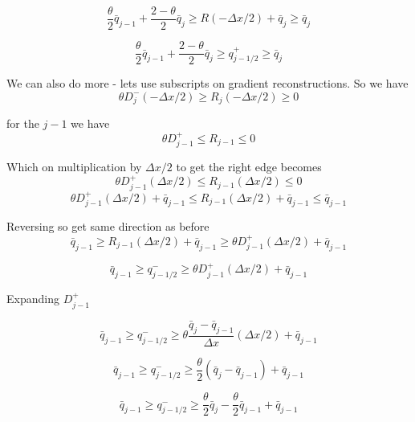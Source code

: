 \documentclass[10pt]{article}
\begin{document}
\[\frac{\theta}{2} \bar{q}_{j-1} + \frac{2 - \theta}{2}\bar{q}_{j}  \ge R \left(-\Delta x/2\right) + \bar{q}_{j}  \ge \bar{q}_{j} \]

\[\frac{\theta}{2} \bar{q}_{j-1} + \frac{2 - \theta}{2}\bar{q}_{j}  \ge q^+_{j-1/2} \ge \bar{q}_{j} \]

%

We can also do more - lets use subscripts on gradient reconstructions. So we have
\[\theta D^-_j \left(-\Delta x/2\right) \ge R_j \left(-\Delta x/2\right)  \ge 0 \]

for the $j-1$ we have
\[\theta D^+_{j-1} \le R_{j-1} \le 0\]

Which on multiplication by $\Delta x/2$ to get the right edge becomes
\[\theta D^+_{j-1} \left(\Delta x / 2\right)  \le R_{j-1} \left(\Delta x / 2\right) \le 0\]
\[\theta D^+_{j-1} \left(\Delta x / 2\right) + \bar{q}_{j-1}  \le R_{j-1} \left(\Delta x / 2\right) + \bar{q}_{j-1}  \le  \bar{q}_{j-1} \]

Reversing  so get same direction as before
\[\bar{q}_{j-1} \ge R_{j-1} \left(\Delta x / 2\right) + \bar{q}_{j-1} \ge \theta D^+_{j-1} \left(\Delta x / 2\right) + \bar{q}_{j-1}    \]

\[\bar{q}_{j-1} \ge q^-_{j-1/2} \ge \theta D^+_{j-1} \left(\Delta x / 2\right) + \bar{q}_{j-1}    \]

Expanding $D^+_{j-1}$

\[\bar{q}_{j-1} \ge q^-_{j-1/2} \ge \theta \dfrac{\bar{q}_{j} - \bar{q}_{j-1}}{\Delta x} \left(\Delta x / 2\right) + \bar{q}_{j-1}    \]

\[\bar{q}_{j-1} \ge q^-_{j-1/2} \ge  \frac{\theta}{2} \left(\bar{q}_{j} - \bar{q}_{j-1}\right) + \bar{q}_{j-1}    \]

\[\bar{q}_{j-1} \ge q^-_{j-1/2} \ge  \frac{\theta}{2} \bar{q}_{j}  - \frac{\theta}{2}\bar{q}_{j-1} + \bar{q}_{j-1}    \]
\end{document}

